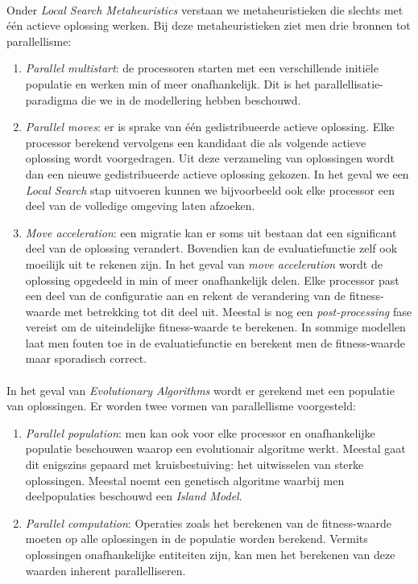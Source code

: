\paragraph{}
Onder \emph{Local Search Metaheuristics} verstaan we metaheuristieken die slechts met \'e\'en actieve oplossing werken. Bij deze metaheuristieken ziet men drie bronnen tot parallellisme:
\begin{enumerate}
 \item \emph{Parallel multistart}: de processoren starten met een verschillende initi\"ele populatie en werken min of meer onafhankelijk. Dit is het parallellisatie-paradigma die we in de modellering hebben beschouwd.
 \item \emph{Parallel moves}: er is sprake van \'e\'en gedistribueerde actieve oplossing. Elke processor berekend vervolgens een kandidaat die als volgende actieve oplossing wordt voorgedragen. Uit deze verzameling van oplossingen wordt dan een nieuwe gedistribueerde actieve oplossing gekozen. In het geval we een \emph{Local Search} stap uitvoeren kunnen we bijvoorbeeld ook elke processor een deel van de volledige omgeving laten afzoeken.
 \item \emph{Move acceleration}: een migratie kan er soms uit bestaan dat een significant deel van de oplossing verandert. Bovendien kan de evaluatiefunctie zelf ook moeilijk uit te rekenen zijn. In het geval van \emph{move acceleration} wordt de oplossing opgedeeld in min of meer onafhankelijk delen. Elke processor past een deel van de configuratie aan en rekent de verandering van de fitness-waarde met betrekking tot dit deel uit. Meestal is nog een \emph{post-processing} fase vereist om de uiteindelijke fitness-waarde te berekenen. In sommige modellen laat men fouten toe in de evaluatiefunctie en berekent men de fitness-waarde maar sporadisch correct.
\end{enumerate}

\paragraph{}
In het geval van \emph{Evolutionary Algorithms} wordt er gerekend met een populatie van oplossingen. Er worden twee vormen van parallellisme voorgesteld:
\begin{enumerate}
 \item \emph{Parallel population}: men kan ook voor elke processor en onafhankelijke populatie beschouwen waarop een evolutionair algoritme werkt. Meestal gaat dit enigszins gepaard met kruisbestuiving: het uitwisselen van sterke oplossingen. Meestal noemt een genetisch algoritme waarbij men deelpopulaties beschouwd een \emph{Island Model}\cite{Whitley98theisland,parallelgeneticalgorithms}.
 \item \emph{Parallel computation}: Operaties zoals het berekenen van de fitness-waarde moeten op alle oplossingen in de populatie worden berekend. Vermits oplossingen onafhankelijke entiteiten zijn, kan men het berekenen van deze waarden inherent parallelliseren.
\end{enumerate}

